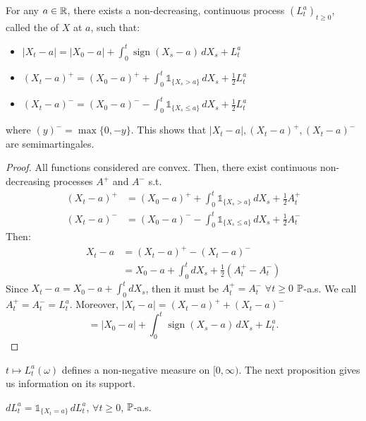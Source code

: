 \begin{theorem}
    For any $a \in \mathbb R$, there exists a non-decreasing, continuous process $(L_t^a)_{t \geq 0}$, called the  of $X$ at $a$, such that:
    \begin{itemize}
        \item $|X_t - a| = |X_0 - a| + \int_0^t \operatorname{sign}(X_s - a) \, dX_s + L_t^a$
        \item $(X_t - a)^+ = (X_0 - a)^+ + \int_0^t \mathbb{1}_{\{X_s > a\}} \, dX_s + \frac{1}{2} L_t^a$
        \item $(X_t - a)^- = (X_0 - a)^- - \int_0^t \mathbb{1}_{\{X_s \leq a\}} \, dX_s + \frac{1}{2} L_t^a$
    \end{itemize}
    where $(y)^- = \max\{0, -y\}$.
    This shows that $|X_t - a|, (X_t - a)^+, (X_t - a)^-$ are semimartingales.
\end{theorem}

\begin{proof}
    All functions considered are convex. Then, there exist continuous non-decreasing processes $A^+$ and $A^-$ s.t.
    \begin{align*}
        (X_t - a)^+ &= (X_0 - a)^+ + \int_0^t \mathbb{1}_{\{X_s > a\}} \, dX_s + \frac{1}{2} A_t^+ \\
        (X_t - a)^- &= (X_0 - a)^- - \int_0^t \mathbb{1}_{\{X_s \leq a\}} \, dX_s + \frac{1}{2} A_t^-
    \end{align*}
    Then:
    \begin{align*}
        X_t - a &= (X_t - a)^+ - (X_t - a)^- \\
        &= X_0 - a + \int_0^t dX_s + \frac{1}{2} (A_t^+ - A_t^-)
    \end{align*}
    Since $X_t - a = X_0 - a + \int_0^t dX_s$, then it must be $A_t^+ = A_t^-$ $\forall t \geq 0$ $\mathbb P$-a.s.
    We call $A_t^+ = A_t^- = L_t^a$.
    Moreover, $|X_t - a| = (X_t - a)^+ + (X_t - a)^-$
    \[ = |X_0 - a| + \int_0^t \operatorname{sign}(X_s - a) \, dX_s + L_t^a. \]
\end{proof}

\begin{remark}
    $t \mapsto L_t^a(\omega)$ defines a non-negative measure on $[0, \infty)$. The next proposition gives us information on its support.
\end{remark}

\begin{proposition}
    $dL_t^a = \mathbb{1}_{\{X_t = a\}} \, dL_t^a$, $\forall t \geq 0$, $\mathbb P$-a.s.
\end{proposition}

